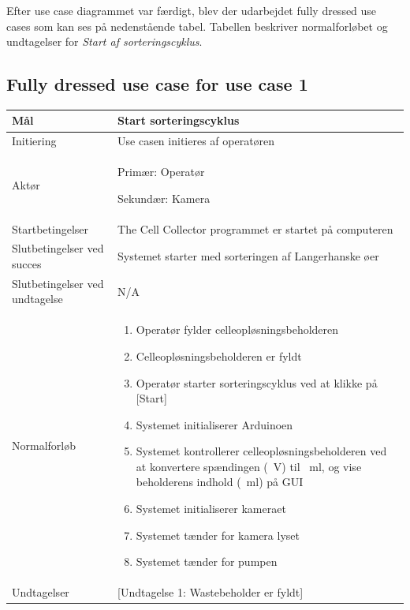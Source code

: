 Efter use case diagrammet var færdigt, blev der udarbejdet fully dressed use cases som kan ses på nedenstående tabel. Tabellen beskriver normalforløbet og undtagelser for \textit{Start af sorteringscyklus}. 

\newpage 
\subsection{Fully dressed use case for use case 1}
\begin{center}
		\begin{longtable}{ | m{4cm} | m{8cm}| } 
			\hline
			Mål & Start sorteringscyklus \\ 
			\hline
			Initiering &  Use casen initieres af operatøren\\
			\hline
			Aktør & 
			Primær: Operatør
			
			 Sekundær: Kamera			  \\ 
			\hline
			Startbetingelser & The Cell Collector programmet er startet på computeren \\ 
			\hline	
			Slutbetingelser ved succes & Systemet starter med sorteringen af Langerhanske øer \\
			\hline
			Slutbetingelser ved undtagelse & N/A \\
			\hline
			Normalforløb & \begin{enumerate}
				\item Operatør fylder celleopløsningsbeholderen
				\item Celleopløsningsbeholderen er fyldt
				\item Operatør starter sorteringscyklus ved at klikke på [Start]
				\subitem [Undtagelse 1: Wastebeholder er fyldt] 
				\item Systemet initialiserer Arduinoen
				\subitem [Undtagelse 2: Ingen forbindelse til Arduino]
				\item Systemet kontrollerer celleopløsningsbeholderen ved at konvertere spændingen (\SI{}{\volt})  til \SI{}{\milli\litre}, og vise beholderens indhold (\SI{}{\milli\litre}) på GUI
				\item Systemet initialiserer kameraet
				\subitem [Undtagelse 3: Kameraet initialiserer ikke]
				\item Systemet tænder for kamera lyset
				\item Systemet tænder for pumpen
				
			\end{enumerate} \\ 
			\hline
			Undtagelser & [Undtagelse 1: Wastebeholder er fyldt] 
			

\end{longtable}
\end{center}
